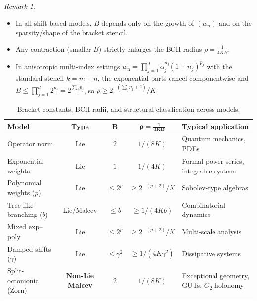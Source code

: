 \documentclass[11pt]{amsart}
\numberwithin{equation}{section}
\theoremstyle{remark}
\newtheorem{remark}[theorem]{Remark}
\begin{document}
\medskip
\begin{remark}\begin{itemize}
\item[(i)] In all shift-based models, $B$ depends only on the growth of $(w_n)$ and on the sparsity/shape of the bracket stencil.
\item[(ii)] Any contraction (smaller $B$) strictly enlarges the BCH radius $\rho=\frac{1}{4KB}$.
\item[(iii)] In anisotropic multi-index settings $w_{\mathbf n}=\prod_{j=1}^d \alpha_j^{n_j}(1+n_j)^{p_j}$ with the standard stencil $k=m+n$, the exponential parts cancel componentwise and
$B\le \prod_{j=1}^d 2^{p_j}=2^{\sum_j p_j}$, so $\rho \ge 2^{-(\sum_j p_j + 2)}/K$.\end{itemize}
\end{remark}



\begin{table}[htbp]
\centering
\caption{Bracket constants, BCH radii, and structural classification across models.}
\label{tab:models-classified}
\renewcommand{\arraystretch}{1.1}
\setlength{\tabcolsep}{5pt}
\begin{tabularx}{\textwidth}{@{}l c c c X@{}}
\toprule
\textbf{Model} & \textbf{Type} & $\boldsymbol{B}$ & $\boldsymbol{\rho = \tfrac{1}{4KB}}$ & \textbf{Typical application} \\
\midrule
Operator norm & Lie & $2$ & $1/(8K)$ & Quantum mechanics, PDEs \\
Exponential weights & Lie & $1$ & $1/(4K)$ & Formal power series, integrable systems \\
Polynomial weights ($p$) & Lie & $\leq 2^p$ & $\geq 2^{-(p+2)}/K$ & Sobolev-type algebras \\
Tree-like branching ($b$) & Lie/Malcev & $\leq b$ & $\geq 1/(4Kb)$ & Combinatorial dynamics \\
Mixed exp--poly & Lie & $\leq 2^p$ & $\geq 2^{-(p+2)}/K$ & Multi-scale analysis \\
Damped shifts ($\gamma$) & Lie & $\leq \gamma^2$ & $\geq 1/(4K\gamma^2)$ & Dissipative systems \\
Split-octonionic (Zorn) & \textbf{Non-Lie Malcev} & $2$ & $1/(8K)$ & Exceptional geometry, GUTs, $G_2$-holonomy \\
\bottomrule
\end{tabularx}
\end{table}
\end{document}
